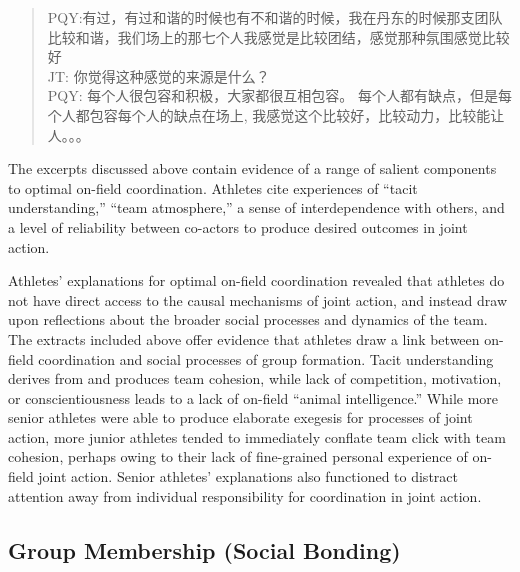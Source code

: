 \begin{CJK}{UTF8}{gbsn}
\begin{quotation}
  PQY:有过，有过和谐的时候也有不和谐的时候，我在丹东的时候那支团队比较和谐，我们场上的那七个人我感觉是比较团结，感觉那种氛围感觉比较好 \\
  JT: 你觉得这种感觉的来源是什么？\\
  PQY: 每个人很包容和积极，大家都很互相包容。 每个人都有缺点，但是每个人都包容每个人的缺点在场上, 我感觉这个比较好，比较动力，比较能让人。。。
\end{quotation}


The excerpts discussed above contain evidence of a range of salient components to optimal on-field coordination.  Athletes cite experiences of ``tacit understanding,'' ``team atmosphere,'' a sense of interdependence with others, and a level of reliability between co-actors to produce desired outcomes in joint action.



Athletes' explanations for optimal on-field coordination revealed that athletes do not have direct access to the causal mechanisms of joint action, and instead draw upon reflections about the broader social processes and dynamics of the team.  The extracts included above offer evidence that athletes draw a link between on-field coordination and social processes of group formation.  Tacit understanding derives from and produces team cohesion, while lack of competition, motivation, or conscientiousness leads to a lack of on-field ``animal intelligence.''  While more senior athletes were able to produce elaborate exegesis for processes of joint action, more junior athletes tended to immediately conflate team click with team cohesion, perhaps owing to their lack of fine-grained personal experience of on-field joint action.  Senior athletes' explanations also functioned to distract attention away from individual responsibility for coordination in joint action.






\clearpage
\subsection{Group Membership (Social Bonding)\label{sect:socialBonding}}


\end{CJK}
